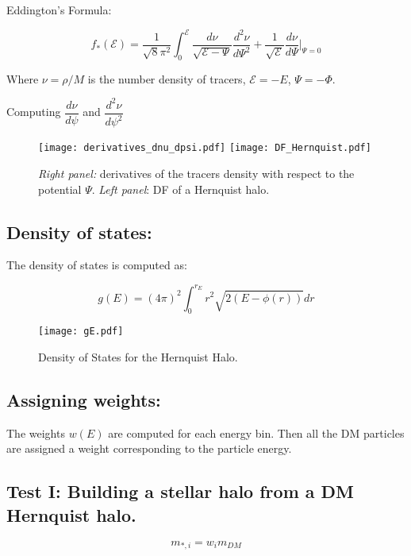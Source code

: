 \documentclass[14pt]{article}
\begin{document}
Eddington's Formula: 

\begin{equation}
  f_*(\mathcal{E}) = \dfrac{1}{\sqrt{8}\pi^2}\int_0^{\mathcal{E}} \dfrac{d
  \nu}{\sqrt{\mathcal{E}- \Psi}}  \dfrac{d^2 \nu}{d \Psi^2} +
  \dfrac{1}{\sqrt{\mathcal{E}}}\dfrac{d \nu}{d\Psi} \Bigg\vert _{\Psi=0} 
\end{equation}

Where $\nu=\rho/M$ is the number density of tracers, $\mathcal{E}=-E$,
$\Psi=-\Phi$.

Computing $\dfrac{d \nu}{d \psi}$ and $\dfrac{d^2 \nu}{d \psi^2}$


\begin{figure}[H]
  \centering
  \texttt{[image: derivatives\_dnu\_dpsi.pdf]}
  \texttt{[image: DF\_Hernquist.pdf]}
  \caption{\textit{Right panel:} derivatives of the tracers density with respect
  to the potential $\Psi$. \textit{Left panel}: DF of a Hernquist halo.}
\end{figure}



\subsection{Density of states:}


The density of states is computed as:

\begin{equation}
  g(E) = (4\pi)^2 \int_0^{r_E} r^2 \sqrt{2(E - \phi(r))} dr
\end{equation}


\begin{figure}[H]
  \centering
  \texttt{[image: gE.pdf]}
  \caption{Density of States for the Hernquist Halo.}
\end{figure}

\subsection{Assigning weights:}

The weights $w(E)$ are computed for each energy bin. Then all the DM particles
are assigned a weight corresponding to the particle energy.

\subsection{Test I: Building a stellar halo from a DM Hernquist halo.}

\begin{equation}
  m_{*,i} = w_i m_{DM} 
\end{equation}
\end{document}
